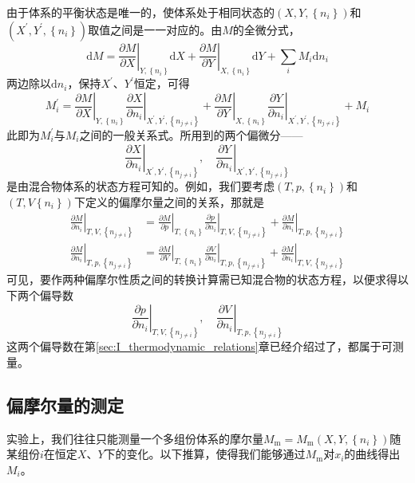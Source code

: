 \documentclass[main.tex]{subfiles}
\begin{document}
由于体系的平衡状态是唯一的，使体系处于相同状态的$\left(X,Y,\left\{n_i\right\}\right)$和$\left(X^\prime,Y^\prime,\left\{n_i\right\}\right)$取值之间是一一对应的。由$M$的全微分式，
\[\mathrm{d}M=\left.\frac{\partial M}{\partial X}\right|_{Y,\left\{n_i\right\}}\mathrm{d}X+\left.\frac{\partial M}{\partial Y}\right|_{X,\left\{n_i\right\}}\mathrm{d}Y+\sum_i M_i\mathrm{d}n_i\]
两边除以$\mathrm{d}n_i$，保持$X^\prime$、$Y^\prime$恒定，可得
\[M_i^\prime=\left.\frac{\partial M}{\partial X}\right|_{Y,\left\{n_i\right\}}\left.\frac{\partial X}{\partial n_i}\right|_{X^\prime,Y^\prime,\left\{n_{j\neq i}\right\}}+\left.\frac{\partial M}{\partial Y}\right|_{X,\left\{n_i\right\}}\left.\frac{\partial Y}{\partial n_i}\right|_{X^\prime,Y^\prime,\left\{n_{j\neq i}\right\}}+M_i\]
此即为$M_i^\prime$与$M_i$之间的一般关系式。所用到的两个偏微分——
\[\left.\frac{\partial X}{\partial n_i}\right|_{X^\prime,Y^\prime,\left\{n_{j\neq i}\right\}},\quad\left.\frac{\partial Y}{\partial n_i}\right|_{X^\prime,Y^\prime,\left\{n_{j\neq i}\right\}}\]
是由混合物体系的状态方程可知的。例如，我们要考虑$\left(T,p,\left\{n_i\right\}\right)$和$\left(T,V\left\{n_i\right\}\right)$下定义的偏摩尔量之间的关系，那就是
\begin{align*}
    \left.\frac{\partial M}{\partial n_i}\right|_{T,V,\left\{n_{j\neq i}\right\}} & =\left.\frac{\partial M}{\partial p}\right|_{T,\left\{n_i\right\}}\left.\frac{\partial p}{\partial n_i}\right|_{T,V,\left\{n_{j\neq i}\right\}}+\left.\frac{\partial M}{\partial n_i}\right|_{T,p,\left\{n_{j\neq i}\right\}} \\
    \left.\frac{\partial M}{\partial n_i}\right|_{T,p,\left\{n_{j\neq i}\right\}} & =\left.\frac{\partial M}{\partial V}\right|_{T,\left\{n_i\right\}}\left.\frac{\partial V}{\partial n_i}\right|_{T,p,\left\{n_{j\neq i}\right\}}+\left.\frac{\partial M}{\partial n_i}\right|_{T,V,\left\{n_{j\neq i}\right\}}
\end{align*}
可见，要作两种偏摩尔性质之间的转换计算需已知混合物的状态方程，以便求得以下两个偏导数
\[\left.\frac{\partial p}{\partial n_i}\right|_{T,V,\left\{n_{j\neq i}\right\}},\quad\left.\frac{\partial V}{\partial n_i}\right|_{T,p,\left\{n_{j\neq i}\right\}}\]
这两个偏导数在第\ref{sec:I_thermodynamic_relations}章已经介绍过了，都属于可测量。

\subsection{偏摩尔量的测定}
实验上，我们往往只能测量一个多组份体系的摩尔量$M_\text{m}=M_\text{m}\left(X,Y,\left\{n_i\right\}\right)$随某组份$i$在恒定$X$、$Y$下的变化。以下推算，使得我们能够通过$M_\text{m}$对$x_i$的曲线得出$M_i$。
\end{document}
